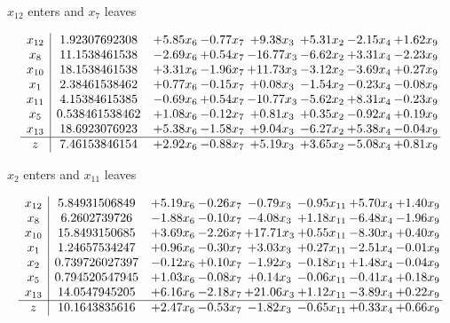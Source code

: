 \documentclass[8pt]{article}
\begin{document}
 $ x_{12} $ enters and $ x_{7} $ leaves 

 \[\begin{array}{c| c c@{\hskip 2pt} c@{\hskip 2pt} c@{\hskip 2pt} c@{\hskip 2pt} c@{\hskip 2pt} c@{\hskip 2pt} }
 x_{12}   &  1.92307692308 & +  5.85 x_{6} & -0.77 x_{7} & +  9.38 x_{3} & +  5.31 x_{2} & -2.15 x_{4} & +  1.62 x_{9}\\
 x_{8}   &  11.1538461538 & -2.69 x_{6} & +  0.54 x_{7} & -16.77 x_{3} & -6.62 x_{2} & +  3.31 x_{4} & -2.23 x_{9}\\
 x_{10}   &  18.1538461538 & +  3.31 x_{6} & -1.96 x_{7} & + 11.73 x_{3} & -3.12 x_{2} & -3.69 x_{4} & +  0.27 x_{9}\\
 x_{1}   &  2.38461538462 & +  0.77 x_{6} & -0.15 x_{7} & +  0.08 x_{3} & -1.54 x_{2} & -0.23 x_{4} & -0.08 x_{9}\\
 x_{11}   &  4.15384615385 & -0.69 x_{6} & +  0.54 x_{7} & -10.77 x_{3} & -5.62 x_{2} & +  8.31 x_{4} & -0.23 x_{9}\\
 x_{5}   &  0.538461538462 & +  1.08 x_{6} & -0.12 x_{7} & +  0.81 x_{3} & +  0.35 x_{2} & -0.92 x_{4} & +  0.19 x_{9}\\
 x_{13}   &  18.6923076923 & +  5.38 x_{6} & -1.58 x_{7} & +  9.04 x_{3} & -6.27 x_{2} & +  5.38 x_{4} & -0.04 x_{9}\\
\hline
z    &  7.46153846154 & +  2.92 x_{6} & -0.88 x_{7} & +  5.19 x_{3} & +  3.65 x_{2} & -5.08 x_{4} & +  0.81 x_{9}\\
\end{array}\]


 $ x_{2} $ enters and $ x_{11} $ leaves 

 \[\begin{array}{c| c c@{\hskip 2pt} c@{\hskip 2pt} c@{\hskip 2pt} c@{\hskip 2pt} c@{\hskip 2pt} c@{\hskip 2pt} }
 x_{12}   &  5.84931506849 & +  5.19 x_{6} & -0.26 x_{7} & -0.79 x_{3} & -0.95 x_{11} & +  5.70 x_{4} & +  1.40 x_{9}\\
 x_{8}   &  6.2602739726 & -1.88 x_{6} & -0.10 x_{7} & -4.08 x_{3} & +  1.18 x_{11} & -6.48 x_{4} & -1.96 x_{9}\\
 x_{10}   &  15.8493150685 & +  3.69 x_{6} & -2.26 x_{7} & + 17.71 x_{3} & +  0.55 x_{11} & -8.30 x_{4} & +  0.40 x_{9}\\
 x_{1}   &  1.24657534247 & +  0.96 x_{6} & -0.30 x_{7} & +  3.03 x_{3} & +  0.27 x_{11} & -2.51 x_{4} & -0.01 x_{9}\\
 x_{2}   &  0.739726027397 & -0.12 x_{6} & +  0.10 x_{7} & -1.92 x_{3} & -0.18 x_{11} & +  1.48 x_{4} & -0.04 x_{9}\\
 x_{5}   &  0.794520547945 & +  1.03 x_{6} & -0.08 x_{7} & +  0.14 x_{3} & -0.06 x_{11} & -0.41 x_{4} & +  0.18 x_{9}\\
 x_{13}   &  14.0547945205 & +  6.16 x_{6} & -2.18 x_{7} & + 21.06 x_{3} & +  1.12 x_{11} & -3.89 x_{4} & +  0.22 x_{9}\\
\hline
z    &  10.1643835616 & +  2.47 x_{6} & -0.53 x_{7} & -1.82 x_{3} & -0.65 x_{11} & +  0.33 x_{4} & +  0.66 x_{9}\\
\end{array}\]
\end{document}
